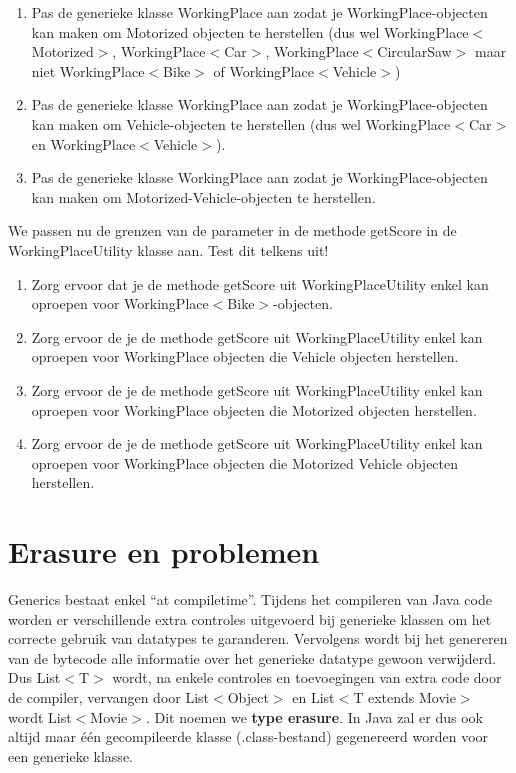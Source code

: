 \begin{oefening}
\begin{enumerate}[label=(\alph*)]
\item Pas de generieke klasse WorkingPlace aan zodat je WorkingPlace-objecten kan maken om Motorized objecten te herstellen (dus wel WorkingPlace$<$Motorized$>$, WorkingPlace$<$Car$>$, WorkingPlace$<$CircularSaw$>$ maar niet WorkingPlace$<$Bike$>$ of WorkingPlace$<$Vehicle$>$)
\item Pas de generieke klasse WorkingPlace aan zodat je WorkingPlace-objecten kan maken om
Vehicle-objecten te herstellen (dus wel WorkingPlace$<$Car$>$ en WorkingPlace$<$Vehicle$>$).
\item Pas de generieke klasse WorkingPlace aan zodat je WorkingPlace-objecten kan maken om
Motorized-Vehicle-objecten te herstellen.
\end{enumerate}
We passen nu de grenzen van de parameter in de methode getScore in de WorkingPlaceUtility
klasse aan. Test dit telkens uit!
\begin{enumerate}[label=(\alph*)]
\item Zorg ervoor dat je de methode getScore uit WorkingPlaceUtility enkel kan oproepen voor
WorkingPlace$<$Bike$>$-objecten.
\item Zorg ervoor de je de methode getScore uit WorkingPlaceUtility enkel kan oproepen voor
WorkingPlace objecten die Vehicle objecten herstellen.
\item Zorg ervoor de je de methode getScore uit WorkingPlaceUtility enkel kan oproepen voor
WorkingPlace objecten die Motorized objecten herstellen.
\item  Zorg ervoor de je de methode getScore uit WorkingPlaceUtility enkel kan oproepen voor WorkingPlace objecten die Motorized Vehicle objecten herstellen. 
\end{enumerate}
\end{oefening}


\section{Erasure en problemen}

Generics bestaat enkel ``at compiletime''. 
Tijdens het compileren van Java code worden er verschillende extra controles uitgevoerd bij generieke klassen om het correcte gebruik van datatypes te garanderen. 
Vervolgens wordt bij het genereren van de bytecode alle informatie over het generieke datatype gewoon verwijderd. Dus List$<$T$>$ wordt, na enkele controles en toevoegingen van extra code door de compiler, vervangen door List$<$Object$>$ en List$<$T extends Movie$>$ wordt List$<$Movie$>$. Dit noemen we \textbf{type erasure}. In Java zal er dus ook altijd maar \'e\'en gecompileerde klasse (.class-bestand) gegenereerd worden voor een generieke klasse. 

